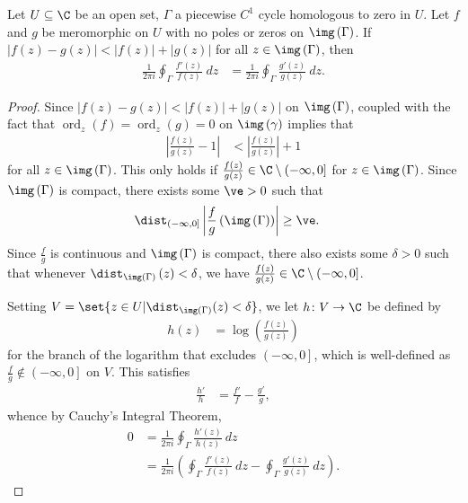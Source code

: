 \documentclass[10pt]{mypackage}
\begin{document}
\begin{theorem}
  Let $U\subseteq \C$ be an open set, $\Gamma$ a piecewise $C^{1}$  cycle homologous to zero in $U$. Let $f$ and $g$ be meromorphic on $U$ with no poles or zeros on $\img\left( \Gamma \right)$. If $\left\vert f(z) - g(z) \right\vert < \left\vert f(z) \right\vert + \left\vert g(z) \right\vert$ for all $z\in \img\left( \Gamma \right)$, then
  \begin{align*}
    \frac{1}{2\pi i}\oint_{\Gamma}^{} \frac{f'(z)}{f(z)}\:dz &= \frac{1}{2\pi i}\oint_{\Gamma}^{} \frac{g'(z)}{g(z)}\:dz.
  \end{align*}
\end{theorem}
\begin{proof}
  Since $\left\vert f(z) - g(z) \right\vert < \left\vert f(z) \right\vert + \left\vert g(z) \right\vert$ on $\img\left( \Gamma \right)$, coupled with the fact that $\operatorname{ord}_{z}(f) = \operatorname{ord}_{z}(g) = 0$ on $\img\left( \gamma \right)$ implies that
  \begin{align*}
    \left\vert \frac{f(z)}{g(z)} - 1 \right\vert &< \left\vert \frac{f(z)}{g(z)} \right\vert + 1
  \end{align*}
  for all $z\in \img\left( \Gamma \right)$. This only holds if $\frac{f(z)}{g(z)} \in \C\setminus \left( -\infty,0 \right]$ for $z\in \img\left( \Gamma \right)$. Since $\img\left( \Gamma \right)$ is compact, there exists some $\ve > 0$ such that
  \begin{align*}
    \dist_{\left( -\infty,0 \right]}\left\vert \frac{f}{g}\left( \img\left( \Gamma \right) \right) \right\vert &\geq \ve.
  \end{align*}
  Since $\frac{f}{g}$ is continuous and $\img\left( \Gamma \right)$ is compact, there also exists some $\delta > 0$ such that whenever $\dist_{\img\left( \Gamma \right)}\left( z \right) < \delta$, we have $\frac{f(z)}{g(z)} \in \C\setminus \left( -\infty,0 \right]$.\newline

  Setting $V = \set{z\in U | \dist_{\img\left( \Gamma \right)}(z) < \delta}$, we let $h\colon V\rightarrow \C$ be defined by
  \begin{align*}
    h(z) &= \log\left( \frac{f(z)}{g(z)} \right)
  \end{align*}
  for the branch of the logarithm that excludes $\left( -\infty,0 \right]$, which is well-defined as $\frac{f}{g}\notin \left( -\infty,0 \right]$ on $V$. This satisfies
  \begin{align*}
    \frac{h'}{h} &= \frac{f'}{f} - \frac{g'}{g},
  \end{align*}
  whence by Cauchy's Integral Theorem,
  \begin{align*}
    0 &= \frac{1}{2\pi i} \oint_{\Gamma}^{} \frac{h'(z)}{h(z)}\:dz\\
      &= \frac{1}{2\pi i} \left( \oint_{\Gamma}^{} \frac{f'(z)}{f(z)}\:dz - \oint_{\Gamma}^{} \frac{g'(z)}{g(z)}\:dz \right).
  \end{align*}
\end{proof}
\end{document}
